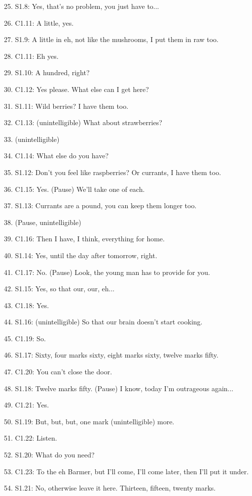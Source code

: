 \documentclass[
]{article}
\begin{document}
25. S1.8: Yes, that's no problem, you just have to...

26. C1.11: A little, yes.

27. S1.9: A little in eh, not like the mushrooms, I put them in raw too.

28. C1.11: Eh yes.

29. S1.10: A hundred, right?

30. C1.12: Yes please. What else can I get here?

31. S1.11: Wild berries? I have them too.

32. C1.13: (unintelligible) What about strawberries?

33. (unintelligible)

34. C1.14: What else do you have?

35. S1.12: Don't you feel like raspberries? Or currants, I have them too.

36. C1.15: Yes. (Pause) We'll take one of each.

37. S1.13: Currants are a pound, you can keep them longer too.

38. (Pause, unintelligible)

39. C1.16: Then I have, I think, everything for home.

40. S1.14: Yes, until the day after tomorrow, right.

41. C1.17: No. (Pause) Look, the young man has to provide for you.

42. S1.15: Yes, so that our, our, eh...

43. C1.18: Yes.

44. S1.16: (unintelligible) So that our brain doesn't start cooking.

45. C1.19: So.

46. S1.17: Sixty, four marks sixty, eight marks sixty, twelve marks fifty.

47. C1.20: You can't close the door.

48. S1.18: Twelve marks fifty. (Pause) I know, today I'm outrageous again...

49. C1.21: Yes.

50. S1.19: But, but, but, one mark (unintelligible) more.

51. C1.22: Listen.

52. S1.20: What do you need?

53. C1.23: To the eh Barmer, but I'll come, I'll come later, then I'll put it under.

54. S1.21: No, otherwise leave it here. Thirteen, fifteen, twenty marks.
\end{document}
